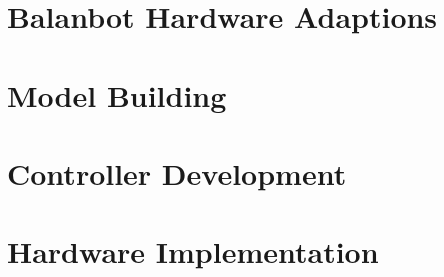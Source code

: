 \newcommand{\german}{false} %
\newcommand{\coloredTitlePage}{true} %
\newcommand{\company}{false}
\newcommand{\ECE}{true}

\usepackage{hyperref}

\makeglossaries

\makeatletter
\newcommand{\myscope}[2] %
{\draw[thick,rotate=#2] (#1) circle (12pt)
 (#1) ++(-0.35,-0.1) -- ++(0.3,0.3) --++(0,-0.3)-- ++(0.3,0.3) --++(0,-0.3);
}
\newcommand{\costumPicWidth}[0]{
0.8\textwidth
}

\newcommand{\costumPlotWidth}[0]{
\textwidth
}






\frontmatter
\renewcommand{\thepage}{\Roman{page}}



\tableofcontents
\printglossary
\mainmatter
\chapter{Balanbot Hardware Adaptions}


\chapter{Model Building}


\chapter{Controller Development}


\chapter{Hardware Implementation}


